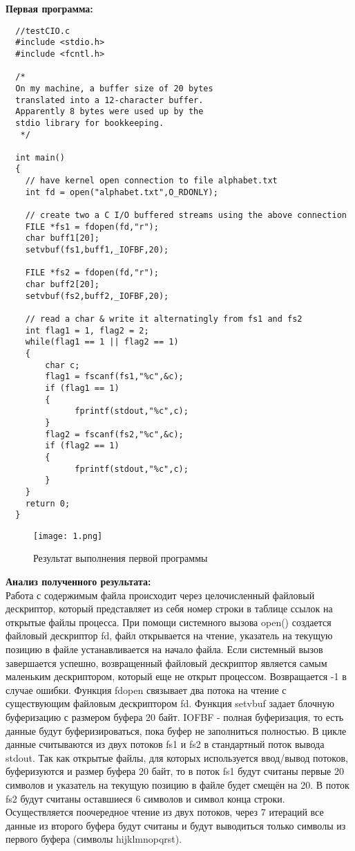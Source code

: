\documentclass[a4paper,12pt]{article}
\begin{document}
\textbf {Первая программа:}
\begin{lstlisting}
  //testCIO.c
  #include <stdio.h>
  #include <fcntl.h>

  /*
  On my machine, a buffer size of 20 bytes
  translated into a 12-character buffer.
  Apparently 8 bytes were used up by the
  stdio library for bookkeeping.
   */

  int main()
  {
    // have kernel open connection to file alphabet.txt
    int fd = open("alphabet.txt",O_RDONLY);

    // create two a C I/O buffered streams using the above connection 
    FILE *fs1 = fdopen(fd,"r");
    char buff1[20];
    setvbuf(fs1,buff1,_IOFBF,20);

    FILE *fs2 = fdopen(fd,"r");
    char buff2[20];
    setvbuf(fs2,buff2,_IOFBF,20);
    
    // read a char & write it alternatingly from fs1 and fs2
    int flag1 = 1, flag2 = 2;
    while(flag1 == 1 || flag2 == 1)
    {
        char c;
        flag1 = fscanf(fs1,"%c",&c);
        if (flag1 == 1) 
        {
	          fprintf(stdout,"%c",c);
        }
        flag2 = fscanf(fs2,"%c",&c);
        if (flag2 == 1) 
        { 
	          fprintf(stdout,"%c",c); 
        }
    }
    return 0;
  }
\end{lstlisting}

\begin{figure}[th]
\texttt{[image: 1.png]}
\caption{Результат выполнения первой программы}
\label{ris:first}
\end{figure}

\textbf {Анализ полученного результата:}\\

Работа с содержимым файла происходит через целочисленный файловый дескриптор, который представляет из себя номер строки в таблице ссылок на открытые файлы процесса. При помощи системного вызова open() создается файловый дескриптор fd, файл открывается на чтение, указатель на текущую позицию в файле устанавливается на начало файла. Если системный  вызов  завершается  успешно,  возвращенный  файловый  дескриптор является самым маленьким дескриптором, который еще не открыт  процессом. Возвращается -1 в случае ошибки. Функция fdopen связывает два потока на чтение с существующим файловым дескриптором fd. Функция setvbuf задает блочную буферизацию с размером буфера 20 байт. \underline{ }IOFBF - полная буферизация, то есть данные будут буферизироваться, пока буфер не заполниться полностью. В цикле данные считываются из двух потоков fs1 и fs2 в стандартный поток вывода stdout. Так как открытые файлы, для которых используется ввод/вывод потоков, буферизуются и размер буфера 20 байт, то в поток fs1 будут считаны первые 20 символов и указатель на текущую позицию в файле будет смещён на 20. В поток fs2 будут считаны оставшиеся 6 символов и символ конца строки. Осуществляется поочередное чтение из двух потоков, через 7 итераций все данные из второго буфера будут считаны и будут выводиться только символы из первого буфера (символы hijklmnopqrst).
\\
\end{document}
